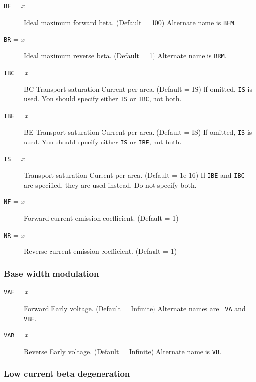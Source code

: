 \begin{description}

\item[{\tt BF} = {\it x}]
Ideal maximum forward beta. (Default = 100)  Alternate name is {\tt BFM}.

\item[{\tt BR} = {\it x}]
Ideal maximum reverse beta.  (Default = 1)  Alternate name is {\tt BRM}.

\item[{\tt IBC} = {\it x}]
BC Transport saturation Current per area.  (Default = IS) If omitted,
{\tt IS} is used.  You should specify either {\tt IS} or {\tt IBC},
not both.

\item[{\tt IBE} = {\it x}]
BE Transport saturation Current per area.  (Default = IS) If omitted,
{\tt IS} is used.  You should specify either {\tt IS} or {\tt IBE},
not both.

\item[{\tt IS} = {\it x}]
Transport saturation Current per area.  (Default = 1e-16) If {\tt IBE}
and {\tt IBC} are specified, they are used instead.  Do not specify
both.

\item[{\tt NF} = {\it x}]
Forward current emission coefficient.  (Default = 1)

\item[{\tt NR} = {\it x}]
Reverse current emission coefficient. (Default = 1)

\end{description}

\subsubsection{Base width modulation}

\begin{description}

\item[{\tt VAF} = {\it x}]
Forward Early voltage.  (Default = Infinite) Alternate names are {\tt
VA} and {\tt VBF}.

\item[{\tt VAR} = {\it x}]
Reverse Early voltage.  (Default = Infinite)  Alternate name is {\tt VB}.

\end{description}

\subsubsection{Low current beta degeneration}

